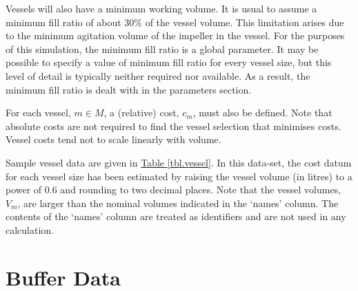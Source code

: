 Vessels will also have a minimum working volume.
It is usual to assume a minimum fill ratio of about 30\% of the vessel volume.
This limitation arises due to the minimum agitation volume of the impeller in
the vessel.
For the purposes of this simulation, the minimum fill ratio is a global
parameter.
It may be possible to specify a value of minimum fill ratio for every vessel
size, but this level of detail is typically neither required nor available.
As a result, the minimum fill ratio is dealt with in the parameters section.

For each vessel, $m \in M$, a (relative) cost, $c_{m}$, must also be defined.
Note that absolute costs are not required to find the vessel selection that
minimises costs.
Vessel costs tend not to scale linearly with volume.

Sample vessel data are given in \hyperref[tbl.vessel]{Table \ref*{tbl.vessel}}.
In this data-set, the cost datum for each vessel size has been estimated by
raising the vessel volume (in litres) to a power of 0.6 and rounding to two
decimal places.
Note that the vessel volumes, $V_{m}$, are larger than the nominal volumes
indicated in the `names' column.  The contents of the `names' column are
treated as identifiers and are not used in any calculation.

\section{Buffer Data}\label{S.bufferdata}

